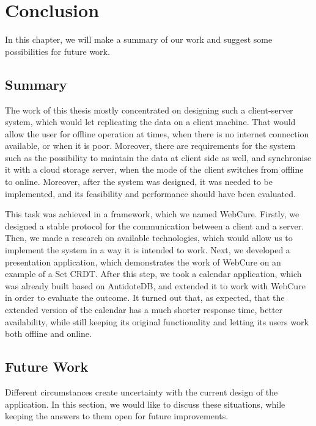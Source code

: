 \chapter{Conclusion}
\label{Conclusion}

In this chapter, we will make a summary of our work and suggest some possibilities for future work.

\section{Summary}
\label{summary}

The work of this thesis mostly concentrated on designing such a client-server system, which would let replicating the data on a client machine. That would allow the user for offline operation at times, when there is no internet connection available, or when it is poor. Moreover, there are requirements for the system such as the possibility to maintain the data at client side as well, and synchronise it with a cloud storage server, when the mode of the client switches from offline to online. Moreover, after the system was designed, it was needed to be implemented, and its feasibility and performance should have been evaluated.

This task was achieved in a framework, which we named WebCure. Firstly, we designed a stable protocol for the communication between a client and a server. Then, we made a research on available technologies, which would allow us to implement the system in a way it is intended to work. Next, we developed a presentation application, which demonstrates the work of WebCure on an example of a Set CRDT. After this step, we took a calendar application, which was already built based on AntidoteDB, and extended it to work with WebCure in order to evaluate the outcome. It turned out that, as expected, that the extended version of the calendar has a much shorter response time, better availability, while still keeping its original functionality and letting its users work both offline and online. 

\section{Future Work}
\label{futurework}

Different circumstances create uncertainty with the current design of the application. In this section, we would like to discuss these situations, while keeping the answers to them open for future improvements.

